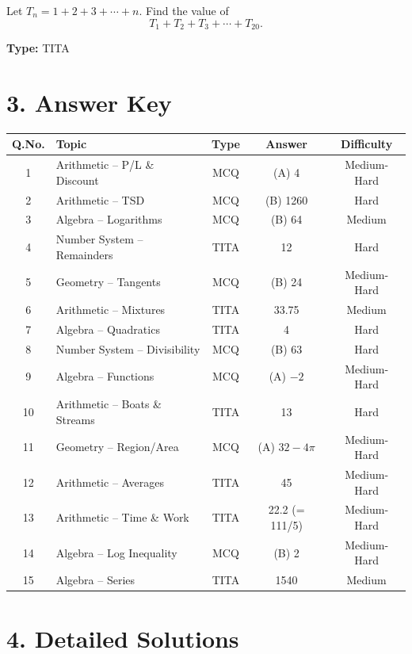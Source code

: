 \documentclass[11pt]{article}
\begin{document}
\begin{tcolorbox}
Let \(T_{n} = 1 + 2 + 3 + \cdots + n\). Find the value of
\[
T_{1} + T_{2} + T_{3} + \cdots + T_{20}.
\]
\end{tcolorbox}

\textbf{Type:} TITA

\newpage
\section*{3. Answer Key}

\begin{longtable}{|c|l|c|c|c|}
\hline
\textbf{Q.No.} & \textbf{Topic} & \textbf{Type} & \textbf{Answer} & \textbf{Difficulty} \\
\hline
1 & Arithmetic – P/L \& Discount & MCQ & (A) 4 & Medium-Hard \\ \hline
2 & Arithmetic – TSD & MCQ & (B) 1260 & Hard \\ \hline
3 & Algebra – Logarithms & MCQ & (B) 64 & Medium \\ \hline
4 & Number System – Remainders & TITA & 12 & Hard \\ \hline
5 & Geometry – Tangents & MCQ & (B) 24 & Medium-Hard \\ \hline
6 & Arithmetic – Mixtures & TITA & 33.75 & Medium \\ \hline
7 & Algebra – Quadratics & TITA & 4 & Hard \\ \hline
8 & Number System – Divisibility & MCQ & (B) 63 & Hard \\ \hline
9 & Algebra – Functions & MCQ & (A) \(-2\) & Medium-Hard \\ \hline
10 & Arithmetic – Boats \& Streams & TITA & 13 & Hard \\ \hline
11 & Geometry – Region/Area & MCQ & (A) \(32-4\pi\) & Medium-Hard \\ \hline
12 & Arithmetic – Averages & TITA & 45 & Medium-Hard \\ \hline
13 & Arithmetic – Time \& Work & TITA & 22.2 (= 111/5) & Medium-Hard \\ \hline
14 & Algebra – Log Inequality & MCQ & (B) 2 & Medium-Hard \\ \hline
15 & Algebra – Series & TITA & 1540 & Medium \\ \hline
\end{longtable}

\section*{4. Detailed Solutions}
\end{document}
